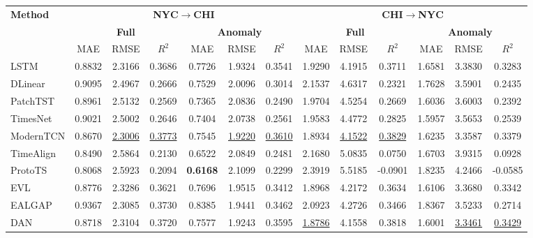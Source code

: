 \begin{table}[htbp]
\centering
\setlength{\tabcolsep}{3.5pt}
\renewcommand\arraystretch{1.0}
\begin{tabular}{l|ccc|ccc|ccc|ccc}
\toprule
\multirow{3}{*}{\textbf{Method}}
 & \multicolumn{6}{c|}{\textbf{NYC$\rightarrow$CHI}}
 & \multicolumn{6}{c}{\textbf{CHI$\rightarrow$NYC}} \\ \cmidrule(lr){2-7}\cmidrule(lr){8-13}
 & \multicolumn{3}{c|}{\textbf{Full}}
 & \multicolumn{3}{c|}{\textbf{Anomaly}}
 & \multicolumn{3}{c|}{\textbf{Full}}
 & \multicolumn{3}{c}{\textbf{Anomaly}} \\ \cmidrule(lr){2-4}\cmidrule(lr){5-7}\cmidrule(lr){8-10}\cmidrule(lr){11-13}
 & MAE & RMSE & $R^2$ & MAE & RMSE & $R^2$ & MAE & RMSE & $R^2$ & MAE & RMSE & $R^2$ \\
\midrule
LSTM       & 0.8832 & 2.3166 & 0.3686 & 0.7726 & 1.9324 & 0.3541 & 1.9290 & 4.1915 & 0.3711 & 1.6581 & 3.3830 & 0.3283 \\
DLinear    & 0.9095 & 2.4967 & 0.2666 & 0.7529 & 2.0096 & 0.3014 & 2.1537 & 4.6317 & 0.2321 & 1.7628 & 3.5901 & 0.2435 \\
PatchTST   & 0.8961 & 2.5132 & 0.2569 & 0.7365 & 2.0836 & 0.2490 & 1.9704 & 4.5254 & 0.2669 & 1.6036 & 3.6003 & 0.2392 \\
TimesNet   & 0.9021 & 2.5002 & 0.2646 & 0.7404 & 2.0738 & 0.2561 & 1.9583 & 4.4772 & 0.2825 & 1.5957 & 3.5653 & 0.2539 \\
ModernTCN  & 0.8670 & \underline{2.3006} & \underline{0.3773} & 0.7545 & \underline{1.9220} & \underline{0.3610} & 1.8934 & \underline{4.1522} & \underline{0.3829} & 1.6235 & 3.3587 & 0.3379 \\
\midrule
TimeAlign  & 0.8490 & 2.5864 & 0.2130 & 0.6522 & 2.0849 & 0.2481 & 2.1680 & 5.0835 & 0.0750 & 1.6703 & 3.9315 & 0.0928 \\
ProtoTS    & 0.8068 & 2.5923 & 0.2094 & \textbf{0.6168} & 2.1099 & 0.2299 & 2.3919 & 5.5185 & -0.0901 & 1.8235 & 4.2466 & -0.0585 \\
\midrule
EVL        & 0.8776 & 2.3286 & 0.3621 & 0.7696 & 1.9515 & 0.3412 & 1.8968 & 4.2172 & 0.3634 & 1.6106 & 3.3680 & 0.3342 \\
EALGAP     & 0.9367 & 2.3085 & 0.3730 & 0.8385 & 1.9441 & 0.3462 & 2.0923 & 4.2726 & 0.3466 & 1.8367 & 3.5233 & 0.2714 \\
DAN        & 0.8718 & 2.3104 & 0.3720 & 0.7577 & 1.9243 & 0.3595 & \underline{1.8786} & 4.1558 & 0.3818 & 1.6001 & \underline{3.3461} & \underline{0.3429} \\

\end{tabular}
\end{table}
